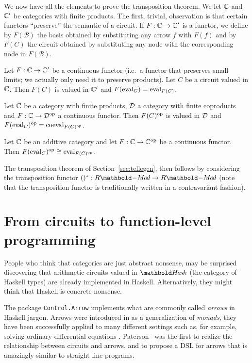 We now have all the elements to prove the transposition theorem. We
let $\mathbb{C}$ and $\mathbb{C}'$ be categories with finite products.  The first,
trivial, observation is that certain functors ``preserve'' the
semantic of a circuit. If $F:\mathbb{C}\rightarrow\mathbb{C}'$ is a functor, we define by
$F(\mathcal{B})$ the basis obtained by substituting any arrow $f$ with
$F(f)$ and by $F(C)$ the circuit obtained by substituting any node
with the corresponding node in $F(\mathcal{B})$.

\begin{proposition}
  Let $F:\mathbb{C}\rightarrow\mathbb{C}'$ be a continuous functor (i.e.\ a functor that
  preserves small limits; we actually only need it to preserve
  products). Let $C$ be a circuit valued in $\mathbb{C}$. Then $F(C)$ is
  valued in $\mathbb{C}'$ and $F(\operatorname{eval}_C)=\operatorname{eval}_{F(C)}$.
\end{proposition}

\begin{corollary}
  Let $\mathbb{C}$ be a category with finite products, $\mathcal{D}$ a category with
  finite coproducts and $F:\mathbb{C}\rightarrow\mathcal{D}^{\mathrm{op}}$ a continuous functor. Then
  $F(C)^{\mathrm{op}}$ is valued in $\mathcal{D}$ and $F(\operatorname{eval}_C)^{\mathrm{op}}=\operatorname{coeval}_{F(C)^{\mathrm{op}}}$.
\end{corollary}

\begin{corollary}
  Let $\mathbb{C}$ be an additive category and let $F:\mathbb{C}\rightarrow\mathbb{C}^{\mathrm{op}}$ be a
  continuous functor. Then $F(\operatorname{eval}_{C})^{\mathrm{op}}\cong\operatorname{eval}_{F(C)^{\mathrm{op}}}$.
\end{corollary}

The transposition theorem of Section~\ref{sec:tellegen}, then follows
by considering the transposition functor
$\dual{()}:\RMod{R}\ra\RMod{R}$ (note that the transposition
functor is traditionally written in a contravariant fashion).


\section{From circuits to function-level programming}
\label{sec:fp}
\lstset{language=haskell} People who think that categories are just
abstract nonsense, may be surprised discovering that arithmetic
circuits valued in $\Hask$ (the category of Haskell types) are
already implemented in Haskell. Alternatively, they might think that
Haskell is concrete nonsense.

The package \lstinline+Control.Arrow+ implements what are commonly
called \emph{arrows} in Haskell jargon. Arrows were introduced in
\cite{hughes98} as a generalization of \emph{monads}, they have been
successfully applied to many different settings such as, for example,
solving ordinary differential equations
\cite{liu+hudak10}. Paterson~\cite{paterson01} was the first to
realize the relationship between circuits and arrows, and to propose a
DSL for arrows that is amazingly similar to straight line programs.

